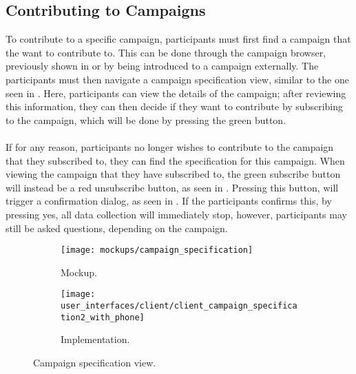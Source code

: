 \subsection{Contributing to Campaigns}

To contribute to a specific campaign, participants must first find a campaign that the want to contribute to. This can be done through the campaign browser, previously shown in  or by being introduced to a campaign externally. The participants must then navigate a campaign specification view, similar to the one seen in . Here, participants can view the details of the campaign; after reviewing this information, they can then decide if they want to contribute by subscribing to the campaign, which will be done by pressing the green button.
\\\\
If for any reason, participants no longer wishes to contribute to the campaign that they subscribed to, they can find the specification for this campaign. When viewing the campaign that they have subscribed to, the green subscribe button will instead be a red unsubscribe button, as seen in . Pressing this button, will trigger a confirmation dialog, as seen in . If the participants confirms this, by pressing yes, all data collection will immediately stop, however, participants may still be asked questions, depending on the campaign.



\begin{figure}[!htbp]
\begin{subfigure}[!t]{.48\textwidth}
  \centering
  \texttt{[image: mockups/campaign\_specification]}
  \caption{Mockup.}
  \label{fig:mockup_campaign_specification}
\end{subfigure}%
\begin{subfigure}[!t]{.52\textwidth}
  \centering
  \texttt{[image: user\_interfaces/client/client\_campaign\_specification2\_with\_phone]}
  \caption{Implementation.}
  \label{fig:implementation_campaign_specification}
\end{subfigure}
\caption{Campaign specification view.}
\label{fig:campaign_specification}
\end{figure}
\FloatBarrier

